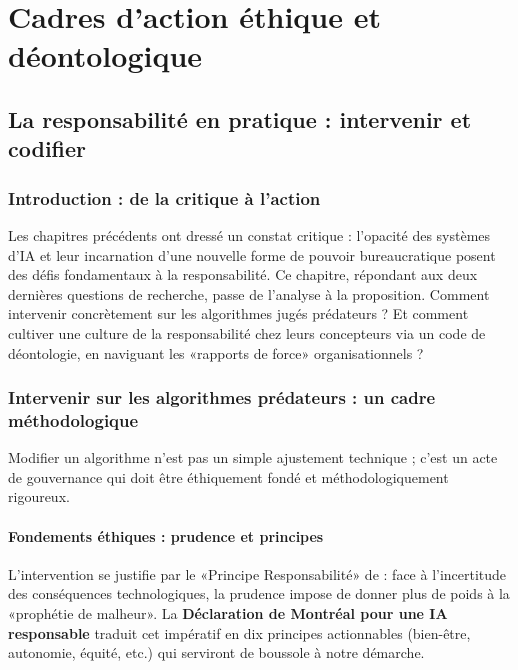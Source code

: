\part{Cadres d'action éthique et déontologique}
\chapter{La responsabilité en pratique : intervenir et codifier}
\label{chap:deontologie}

\section{Introduction : de la critique à l'action}
Les chapitres précédents ont dressé un constat critique : l'opacité des systèmes d'IA et leur incarnation d'une nouvelle forme de pouvoir bureaucratique posent des défis fondamentaux à la responsabilité. Ce chapitre, répondant aux deux dernières questions de recherche, passe de l'analyse à la proposition. Comment intervenir concrètement sur les algorithmes jugés prédateurs ? Et comment cultiver une culture de la responsabilité chez leurs concepteurs via un code de déontologie, en naviguant les «rapports de force» organisationnels ?

\section{Intervenir sur les algorithmes prédateurs : un cadre méthodologique}
Modifier un algorithme n'est pas un simple ajustement technique ; c'est un acte de gouvernance qui doit être éthiquement fondé et méthodologiquement rigoureux.

\subsection{Fondements éthiques : prudence et principes}
L'intervention se justifie par le «Principe Responsabilité» de \citet{Jonas1979} : face à l'incertitude des conséquences technologiques, la prudence impose de donner plus de poids à la «prophétie de malheur». La \textbf{Déclaration de Montréal pour une IA responsable} \citep{MontrealDeclaration2018} traduit cet impératif en dix principes actionnables (bien-être, autonomie, équité, etc.) qui serviront de boussole à notre démarche.

